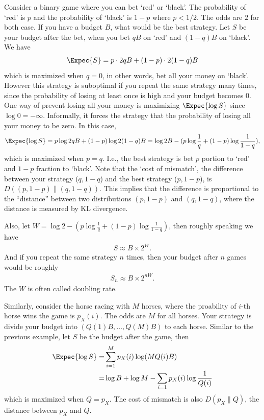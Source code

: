 \documentclass{article}
\begin{document}
\begin{example}[Gambling]
    Consider a binary game where you can bet `red' or `black'.
    The probability of `red' is $p$ and the probability of `black' is $1-p$ where $p<1/2$.
    The odds are $2$ for both case.
    If you have a budget $B$, what would be the best strategy.
    Let $S$ be your budget after the bet, when you bet $qB$ on `red' and $(1-q)B$ on `black'.
    We have
    \begin{align}
        \Expec{S} = p\cdot 2qB + (1-p)\cdot 2(1-q)B
    \end{align}
    which is maximized when $q=0$, in other words, bet all your money on `black'.
    However this strategy is suboptimal if you repeat the same strategy many times, 
    since the probability of losing at least once is high and your budget becomes 0.
    One way of prevent losing all your money is maximizing $\Expec{\log S}$ since $\log 0 = -\infty$.
    Informally, it forces the strategy that the probability of losing all your money to be zero.
    In this case,
    \begin{align}
        \Expec{\log S} = p\log 2qB + (1-p) \log 2(1-q)B = \log 2B - (p\log \frac{1}{q} + (1-p)\log\frac{1}{1-q}),
    \end{align}
    which is maximized when $p=q$.
    I.e., the best strategy is bet $p$ portion to `red' and $1-p$ fraction to `black'.
    Note that the `cost of mismatch', the difference between your strategy ($q,1-q$) and the best strategy ($p, 1-p$), is $D((p, 1-p)\|(q, 1-q))$.
    This implies that the difference is proportional to the ``distance'' between two distributions $(p, 1-p)$ and $(q, 1-q)$,
    where the distance is measured by KL divergence.

    Also, let $W = \log 2 - (p\log \frac{1}{q} + (1-p)\log\frac{1}{1-q})$, then roughly speaking we have
    \begin{align}
        S \approx B \times 2^W.
    \end{align}
    And if you repeat the same strategy $n$ times, then your budget after $n$ games would be roughly
    \begin{align}
        S_n \approx B \times 2^{nW}.
    \end{align}
    The $W$ is often called doubling rate.
\end{example}

\begin{example}
    Similarly, consider the horse racing with $M$ horses, where the proability of $i$-th horse wins the game is $p_X(i)$.
    The odds are $M$ for all horses.
    Your strategy is divide your budget into $(Q(1)B, \dots, Q(M) B)$ to each horse.
    Similar to the previous example, let $S$ be the budget after the game, then
    \begin{align}
        \Expec{\log S} =& \sum_{i=1}^M p_X(i) \log (M Q(i)B)\\
        =& \log B + \log M - \sum_{i=1} p_X(i) \log\frac{1}{Q(i)}
    \end{align}
    which is maximized when $Q=p_X$.
    The cost of mismatch is also $D(p_X \| Q)$, the distance between $p_X$ and $Q$.
\end{example}
\end{document}
